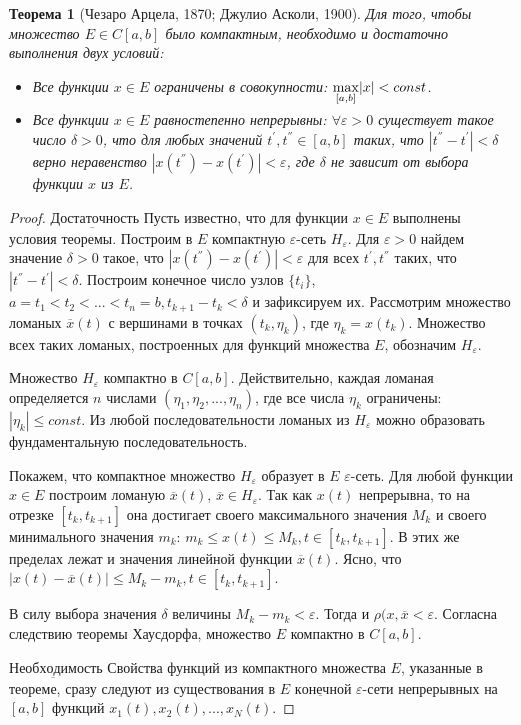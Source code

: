 \documentclass[12pt,a4paper,titlepage]{book}
\theoremstyle{definition}
\theoremstyle{plain}
\newtheorem*{theorem}{Теорема}
\theoremstyle{remark}
\theoremstyle{remark}
\theoremstyle{remark}
\theoremstyle{plain}
\begin{document}
\begin{theorem} [Чезаро Арцела, 1870; Джулио Асколи, 1900]
Для того, чтобы множество $E \in C[a, b]$ было компактным, необходимо и достаточно выполнения двух условий:

\begin{itemize}

	\item  Все функции $x\in E$ ограничены в совокупности: $\smash{\displaystyle\max_{ [a,b]}} |x| < const$.

	\item  Все функции $x\in E$ равностепенно непрерывны: $\forall \varepsilon>0$ существует такое число $\delta>0$, что для любых значений $t^{'}, t^{''} \in [a, b]$ таких, что $|t^{''}-t^{'}| <\delta$ верно неравенство $|x(t^{''})-x(t^{'})| <\varepsilon$, где $\delta$ не зависит от выбора функции $x$ из $E$. 
	
\end{itemize}

\end{theorem}
\begin{proof} 
	$\underbar {Достаточность}$ Пусть известно, что для функции $x\in E$ выполнены условия теоремы. Построим в $E$ компактную 	$\varepsilon$-сеть $H_{\varepsilon}$. Для 	$ \varepsilon>0$ найдем значение $\delta>0$ такое, что $|x(t^{''})-x(t^{'})| <\varepsilon$ для всех $t^{'}, t^{''}$ таких, что $|t^{''}-t^{'}| <\delta$. Построим конечное число узлов $\{t_i\}$, $a=t_1<t_2<...<t_n=b, t_{k+1}-t_k< \delta$ и зафиксируем их. Рассмотрим множество ломаных $\overline{x}(t)$ с вершинами в точках $(t_k, \eta_k )$, где $\eta_k=x(t_k)$. Множество всех таких ломаных, построенных для функций множества $E$, обозначим $H_{\varepsilon}$.
	
	Множество $H_{\varepsilon}$ компактно в $C[a, b]$. Действительно, каждая ломаная определяется $n$ числами $(\eta_1, \eta_2,...,\eta_n )$, где все числа $\eta_k$ ограничены: $|\eta_k|\leq const$. Из любой последовательности ломаных из $H_{\varepsilon}$ можно образовать фундаментальную последовательность.
	
	Покажем, что компактное множество $H_{\varepsilon}$ образует в $E$ $\varepsilon$-сеть. Для любой функции $x\in E$ построим ломаную $\overline{x}(t)$, $\overline{x} \in H_{\varepsilon}$. Так как $x(t)$ непрерывна, то на отрезке $[t_k, t_{k+1}]$ она достигает своего максимального значения $M_k$ и своего минимального значения $m_k$: $m_k \leq x(t) \leq M_k, t \in [t_k, t_{k+1}]$. В этих же пределах лежат и значения линейной функции $\overline{x}(t)$. Ясно, что $|x(t)-\overline{x}(t)|\leq M_k-m_k, t \in [t_k, t_{k+1}]$.
	
	В силу выбора значения $\delta$ величины $M_k-m_k < \varepsilon$. Тогда и $\rho(x, \overline{x} < \varepsilon$. Согласна следствию теоремы Хаусдорфа, множество $E$ компактно в $C[a, b]$.
	
	$\underbar {Необходимость}$ Свойства функций из компактного множества $E$, указанные в теореме, сразу следуют из существования в $E$ $\underbar {конечной}$ $\varepsilon$-сети непрерывных на $[a, b]$ функций $x_1(t), x_2(t),...,x_N(t)$.	

\end{proof}
\end{document}
